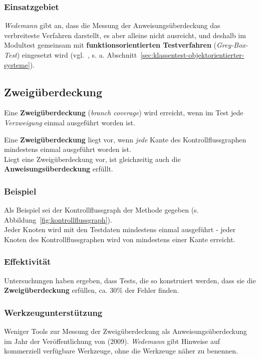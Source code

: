 \subsubsection*{Einsatzgebiet}
\textit{Wedemann} gibt an, dass die Messung der Anweisungsüberdeckung das verbreiteste Verfahren darstellt, es aber alleine nicht ausreicht, und deshalb im Modultest gemeinsam mit \textbf{funktionsorientierten Testverfahren} (\textit{Grey-Box-Test}) eingesetzt wird (vgl.~\cite[51]{Wed09c}, s. a. Abschnitt~\ref{sec:klassentest-objektorientierter-systeme}).

\subsection{Zweigüberdeckung}

Eine \textbf{Zweigüberdeckung} (\textit{branch coverage}) wird erreicht, wenn im Test jede \textit{Verzweigung} einmal ausgeführt worden ist.

\begin{tcolorbox}[title=Zweigüberdeckung]
Eine \textbf{Zweigüberdeckung} liegt vor, wenn \textit{jede} Kante des Kontrollflussgraphen mindestens einmal ausgeführt worden ist.\\
    Liegt eine Zweigüberdeckung vor, ist gleichzeitig auch die \textbf{Anweisungsüberdeckung} erfüllt.
\end{tcolorbox}

\subsubsection*{Beispiel}
Als Beispiel sei der Kontrollflussgraph der Methode  gegeben (s. Abbildung~\ref{fig:kontrollflussgraph}).\\
Jeder Knoten wird mit den Testdaten  mindestens einmal ausgeführt - jeder Knoten des Kontrollflussgraphen wird von mindestens einer Kante erreicht.

\subsubsection*{Effektivität}
Untersuchungen haben ergeben, dass Tests, die so konstruiert werden, dass sie die \textbf{Zweigüberdeckung} erfüllen, ca. 30\% der Fehler finden.

\subsubsection*{Werkzeugunterstützung}
Weniger Tools zur Messung der Zweigüberdeckung als Anweisungsüberdeckung im Jahr der Veröffentlichung von \cite{Wed09c} (2009). \textit{Wedemann} gibt Hinweise auf kommerziell verfügbare Werkzeuge, ohne die Werkzeuge näher zu benennen.


